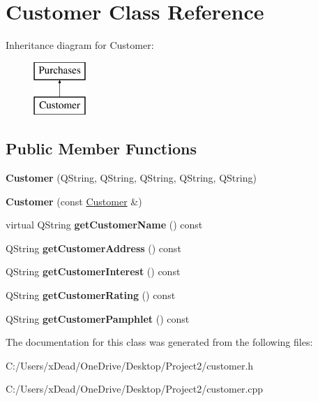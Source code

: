 \hypertarget{class_customer}{}\section{Customer Class Reference}
\label{class_customer}
Inheritance diagram for Customer\+:\begin{figure}[H]
\begin{center}
\leavevmode
\includegraphics[height=2.000000cm]{class_customer}
\end{center}
\end{figure}
\subsection*{Public Member Functions}
\begin{DoxyCompactItemize}
\item 
\mbox{\label{class_customer_aadd2561680381af9de9d3b9abdc54bb8}} 
{\bfseries Customer} (Q\+String, Q\+String, Q\+String, Q\+String, Q\+String)
\item 
\mbox{\label{class_customer_a551c3a7139081bc840501bc06c796e96}} 
{\bfseries Customer} (const \mbox{\hyperlink{class_customer}{Customer}} \&)
\item 
\mbox{\label{class_customer_a65bcde40edff711f6a96847f4720e83e}} 
virtual Q\+String {\bfseries get\+Customer\+Name} () const
\item 
\mbox{\label{class_customer_a11886fba33594f13559f1ddd801cbe4c}} 
Q\+String {\bfseries get\+Customer\+Address} () const
\item 
\mbox{\label{class_customer_a6847c0af28a15a96345205d8cd87bf8c}} 
Q\+String {\bfseries get\+Customer\+Interest} () const
\item 
\mbox{\label{class_customer_a60e7fe5a6c74f4aca05bdf836b1b1c5f}} 
Q\+String {\bfseries get\+Customer\+Rating} () const
\item 
\mbox{\label{class_customer_ab74ea75c93b6ff556326d106f03237c8}} 
Q\+String {\bfseries get\+Customer\+Pamphlet} () const
\end{DoxyCompactItemize}


The documentation for this class was generated from the following files\+:\begin{DoxyCompactItemize}
\item 
C\+:/\+Users/x\+Dead/\+One\+Drive/\+Desktop/\+Project2/customer.\+h\item 
C\+:/\+Users/x\+Dead/\+One\+Drive/\+Desktop/\+Project2/customer.\+cpp\end{DoxyCompactItemize}

